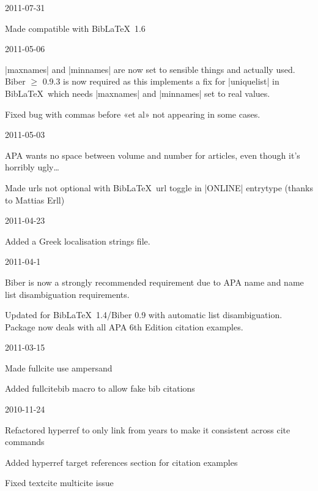 \documentclass{ltxdockit}
\begin{document}
\begin{changelog}
\begin{release}{3.1}{2011-07-31}
\item Made compatible with Bib\LaTeX\ 1.6
\end{release}

\begin{release}{3.0}{2011-05-06}
\item |maxnames| and |minnames| are now set to sensible things and actually
  used. Biber $\geq$ 0.9.3 is now required as this implements a fix for
  |uniquelist| in Bib\LaTeX\ which needs |maxnames| and |minnames| set to
  real values.
\item Fixed bug with commas before «et al» not appearing in some cases.
\end{release}

\begin{release}{2.9}{2011-05-03}
\item APA wants no space between volume and number for articles, even though it's
  horribly ugly\ldots
\item Made urls not optional with Bib\LaTeX\ url toggle in |ONLINE| entrytype (thanks to Mattias Erll)
\end{release}

\begin{release}{2.8}{2011-04-23}
\item Added a Greek localisation strings file.
\end{release}

\begin{release}{2.7}{2011-04-1}
\item Biber is now a strongly recommended requirement due to APA name and
  name list disambiguation requirements.
\item Updated for Bib\LaTeX\ 1.4/Biber 0.9 with automatic list
  disambiguation. Package now deals with all APA 6th Edition citation examples.
\end{release}

\begin{release}{2.6}{2011-03-15}
\item Made fullcite use ampersand
\item Added fullcitebib macro to allow fake bib citations
\end{release}

\begin{release}{2.5}{2010-11-24}
\item Refactored hyperref to only link from years to make it
  consistent across cite commands
\item Added hyperref target references section for citation examples
\item Fixed textcite multicite issue
\end{release}


\end{changelog}
\end{document}

